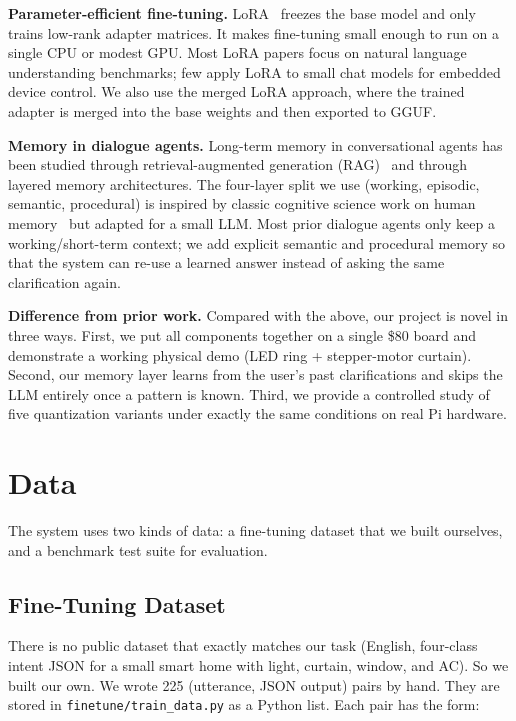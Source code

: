 \documentclass[conference]{IEEEtran}
\begin{document}
\textbf{Parameter-efficient fine-tuning.} LoRA~\cite{hu2022lora} freezes the base model and only trains low-rank adapter matrices. It makes fine-tuning small enough to run on a single CPU or modest GPU. Most LoRA papers focus on natural language understanding benchmarks; few apply LoRA to small chat models for embedded device control. We also use the merged LoRA approach, where the trained adapter is merged into the base weights and then exported to GGUF.

\textbf{Memory in dialogue agents.} Long-term memory in conversational agents has been studied through retrieval-augmented generation (RAG)~\cite{lewis2020rag} and through layered memory architectures. The four-layer split we use (working, episodic, semantic, procedural) is inspired by classic cognitive science work on human memory~\cite{tulving1972episodic} but adapted for a small LLM. Most prior dialogue agents only keep a working/short-term context; we add explicit semantic and procedural memory so that the system can re-use a learned answer instead of asking the same clarification again.

\textbf{Difference from prior work.} Compared with the above, our project is novel in three ways. First, we put all components together on a single \$80 board and demonstrate a working physical demo (LED ring + stepper-motor curtain). Second, our memory layer learns from the user's past clarifications and skips the LLM entirely once a pattern is known. Third, we provide a controlled study of five quantization variants under exactly the same conditions on real Pi hardware.

\section{Data}
\label{sec:data}

The system uses two kinds of data: a fine-tuning dataset that we built ourselves, and a benchmark test suite for evaluation.

\subsection{Fine-Tuning Dataset}

There is no public dataset that exactly matches our task (English, four-class intent JSON for a small smart home with light, curtain, window, and AC). So we built our own. We wrote 225 (utterance, JSON output) pairs by hand. They are stored in \texttt{finetune/train\_data.py} as a Python list. Each pair has the form:
\end{document}
